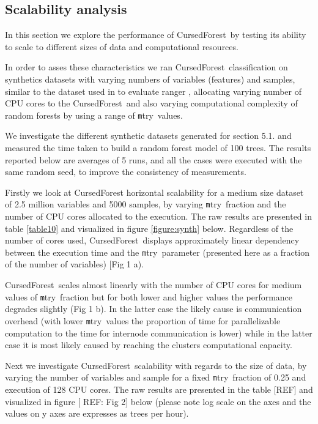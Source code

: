 \documentclass[10pt,letterpaper]{article}
\newcommand{\cursedforest}{{\sc CursedForest}}
\newcommand{\mtry}{{\texttt mtry}}
\begin{document}
\subsection{Scalability analysis}

In this section we explore the performance of \cursedforest\ by testing its ability to scale to different sizes of data
and computational resources.

In order to asses these characteristics we ran \cursedforest\ classification on synthetics datasets with varying numbers
of variables (features) and samples, similar to the dataset used in to evaluate ranger \cite{Wright.and.Ziegle.2016},
allocating varying number of CPU cores to the \cursedforest\ and also varying computational complexity of random forests
by using a range of \mtry\ values.


We investigate the different synthetic datasets generated for section 5.1. and measured the time taken to build a random
forest model of 100 trees. The results reported below are averages of 5 runs, and all the cases were executed with the
same random seed, to improve the consistency of measurements.

Firstly we look at CursedForest horizontal scalability for a medium size dataset of 2.5 million variables and 5000
samples, by varying \mtry\ fraction and the number of CPU cores allocated to the execution. The raw results are
presented in table \ref{table10} and visualized in figure \ref{figure:synth} below. Regardless of the number of cores used,
\cursedforest\ displays approximately linear dependency between the execution time and the \mtry\ parameter (presented
here as a fraction of the number of variables) [Fig 1 a).

\cursedforest{}ales almost linearly with the number of CPU cores for medium values of \mtry\ fraction but for both
lower and higher values the performance degrades slightly (Fig 1 b). In the latter case the likely cause is
communication overhead (with lower \mtry\ values the proportion of time for parallelizable computation to the time for
internode communication is lower) while in the latter case it is most likely caused by reaching the clusters computational
capacity.

Next we investigate \cursedforest{}alability with regards to the size of data, by varying the number of variables and
sample for a fixed \mtry\ fraction of 0.25 and execution of 128 CPU cores. The raw results are presented in the table
[REF] and visualized in figure [ REF: Fig 2] below (please note log scale on the axes and the values on y axes are
expresses as trees per hour).
\end{document}
